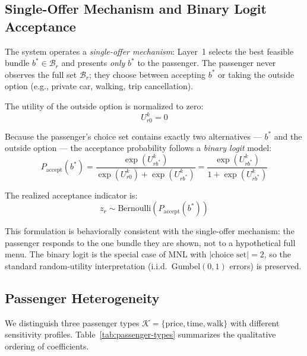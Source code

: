 \subsection{Single-Offer Mechanism and Binary Logit Acceptance}

The system operates a \emph{single-offer mechanism}: Layer~1 selects the best feasible
bundle $b^* \in \mathcal{B}_r$ and presents \emph{only} $b^*$ to the passenger. The
passenger never observes the full set $\mathcal{B}_r$; they choose between accepting $b^*$
or taking the outside option (e.g., private car, walking, trip cancellation).

The utility of the outside option is normalized to zero:
\begin{equation}\label{eq:utility-outside}
  U_{r0}^k = 0
\end{equation}

Because the passenger's choice set contains exactly two alternatives --- $b^*$ and the
outside option --- the acceptance probability follows a \emph{binary logit} model:
\begin{equation}\label{eq:binary-logit}
  P_{\text{accept}}(b^*) = \frac{\exp(U_{rb^*}^k)}{\exp(U_{r0}^k) + \exp(U_{rb^*}^k)}
                         = \frac{\exp(U_{rb^*}^k)}{1 + \exp(U_{rb^*}^k)}
\end{equation}

The realized acceptance indicator is:
\begin{equation}\label{eq:acceptance-indicator}
  z_r \sim \text{Bernoulli}\!\left(P_{\text{accept}}(b^*)\right)
\end{equation}

This formulation is behaviorally consistent with the single-offer mechanism: the passenger
responds to the one bundle they are shown, not to a hypothetical full menu. The binary
logit is the special case of MNL with $|\text{choice set}| = 2$, so the standard
random-utility interpretation (i.i.d.\ Gumbel$(0,1)$ errors) is preserved.

\subsection{Passenger Heterogeneity}

We distinguish three passenger types $\mathcal{K} = \{\text{price}, \text{time}, \text{walk}\}$
with different sensitivity profiles. Table~\ref{tab:passenger-types} summarizes the
qualitative ordering of coefficients.

